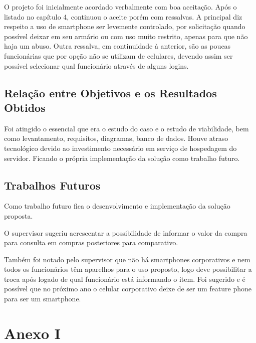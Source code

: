 \documentclass[
	12pt,
	openright,
	oneside, %
	a4paper,
	chapter=TITLE,
	section=TITLE,
	english,
	brazil %
	]{abntex2-udesc}
\begin{document}
O projeto foi inicialmente acordado verbalmente com boa aceitação. Após o listado no capítulo 4, continuou o aceite porém com ressalvas. A principal diz respeito a uso de smartphone ser levemente controlado, por solicitação quando possível deixar em seu armário ou com uso muito restrito, apenas para que não haja um abuso. Outra ressalva, em continuidade à anterior, são as poucas funcionárias que por opção não se utilizam de celulares, devendo assim ser possível selecionar qual funcionário através de alguns logins.

\section{Relação entre Objetivos e os Resultados Obtidos}

Foi atingido o essencial que era o estudo do caso e o estudo de viabilidade, bem como levantamento, requisitos, diagramas, banco de dados.
Houve atraso tecnológico devido ao investimento necessário em serviço de hospedagem do servidor. Ficando o própria implementação da solução como trabalho futuro.

\section{Trabalhos Futuros}

Como trabalho futuro fica o desenvolvimento e implementação da solução proposta.

O supervisor sugeriu acrescentar a possibilidade de informar o valor da compra para consulta em compras posteriores para comparativo.

Também foi notado pelo supervisor que não há smartphones corporativos e nem todos os funcionários têm aparelhos para o uso proposto, logo deve possibilitar a troca após logado de qual funcionário está informando o item. Foi sugerido e é possível que no próximo ano o celular corporativo deixe de ser um feature phone para ser um smartphone.

\postextual




\appendix
\chapter{Anexo I}

\end{document}
